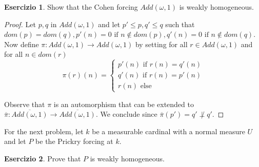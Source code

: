\documentclass[a4paper,12pt]{article}
\theoremstyle{plain}
\theoremstyle{definition}
\newtheorem{esercizio}{Esercizio}
\theoremstyle{remark}
\begin{document}
\begin{esercizio}

	Show that the Cohen forcing $Add(\omega,1)$ is weakly homogeneous.

\end{esercizio}

\begin{proof}

	Let $p,q$ in $Add(\omega,1)$ and let $p' \leq p, q' \leq q$ such that 
	$dom(p) = dom(q), p'(n) = 0 \text{ if } n \not \in dom(p), q'(n) = 0 \text{ if } n \not \in dom(q)$.
	Now define $\pi: Add(\omega,1) \to Add(\omega,1)$ by setting for all $r \in Add(\omega,1)$ and for all $n \in dom(r)$ 
	\[
		\pi(r)(n) =
		\begin{cases}
			p'(n) \text{ if } r(n) = q'(n) \\
			q'(n) \text{ if } r(n) = p'(n) \\
			r(n) \text{ else }
		\end{cases}
	\]

	Observe that $\pi$ is an automorphism that can be extended to $\overline \pi : \overline{Add(\omega,1)} \to \overline{Add(\omega,1)}$.
	We conclude since $\overline \pi (p') = q' \not \perp q'$.

\end{proof}




For the next problem, let $k$ be a measurable cardinal with a normal measure $U$ and let $P$ be the Prickry forcing at $k$.

\begin{esercizio}

	Prove that $P$ is weakly homogeneous.

\end{esercizio}
\end{document}

